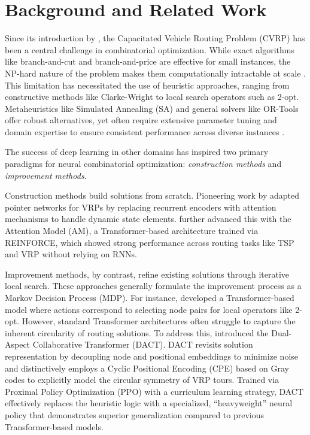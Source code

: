 \documentclass[letterpaper]{article} %
\begin{document}
\section{Background and Related Work}

Since its introduction by \citet{dantzig_truck_1959}, the Capacitated Vehicle Routing Problem (CVRP) has been a central challenge in combinatorial optimization. While exact algorithms like branch-and-cut and branch-and-price are effective for small instances, the NP-hard nature of the problem makes them computationally intractable at scale \citep{toth_vehicle_2002}. This limitation has necessitated the use of heuristic approaches, ranging from constructive methods like Clarke-Wright \citep{clarke_scheduling_1964} to local search operators such as 2-opt. Metaheuristics like Simulated Annealing (SA) \citep{kirkpatrick_optimization_1983} and general solvers like OR-Tools \citep{ortools_routing} offer robust alternatives, yet often require extensive parameter tuning and domain expertise to ensure consistent performance across diverse instances \citep{liu_heuristics_2023, muriyatmoko_heuristics_2024}.

The success of deep learning in other domains has inspired two primary paradigms for neural combinatorial optimization: \textit{construction methods} and \textit{improvement methods}.

Construction methods build solutions from scratch. Pioneering work by \citet{nazari_reinforcement_2018} adapted pointer networks for VRPs by replacing recurrent encoders with attention mechanisms to handle dynamic state elements. \citet{kool_attention_2019} further advanced this with the Attention Model (AM), a Transformer-based architecture trained via REINFORCE, which showed strong performance across routing tasks like TSP and VRP without relying on RNNs.

Improvement methods, by contrast, refine existing solutions through iterative local search. These approaches generally formulate the improvement process as a Markov Decision Process (MDP). For instance, \citet{wu_learning_2022} developed a Transformer-based model where actions correspond to selecting node pairs for local operators like 2-opt. However, standard Transformer architectures often struggle to capture the inherent circularity of routing solutions. To address this, \citet{ma_learning_2021} introduced the Dual-Aspect Collaborative Transformer (DACT). DACT revisits solution representation by decoupling node and positional embeddings to minimize noise and distinctively employs a Cyclic Positional Encoding (CPE) based on Gray codes to explicitly model the circular symmetry of VRP tours. Trained via Proximal Policy Optimization (PPO) with a curriculum learning strategy, DACT effectively replaces the heuristic logic with a specialized, ``heavyweight'' neural policy that demonstrates superior generalization compared to previous Transformer-based models.
\end{document}
